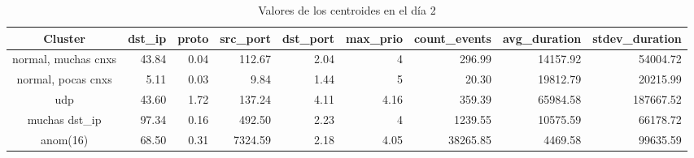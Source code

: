 \begin{table}[h]
    \begingroup
    \setlength{\tabcolsep}{2pt} %
    \renewcommand{\arraystretch}{2} %
    \hspace*{-3cm}
    \begin{tabular}{|c|r|r|r|r|r|r|r|r|}
    \hline
    \textbf{Cluster}    & \textbf{dst\_ip} & \textbf{proto} & \textbf{src\_port} & \textbf{dst\_port} & \textbf{max\_prio} & \textbf{count\_events} & \textbf{avg\_duration} & \textbf{stdev\_duration} \\ \hline
    normal, muchas cnxs & 43.84            & 0.04           & 112.67             & 2.04               & 4                  & 296.99                 & 14157.92               & 54004.72                 \\ \hline
    normal, pocas cnxs  & 5.11             & 0.03           & 9.84               & 1.44               & 5                  & 20.30                  & 19812.79               & 20215.99                 \\ \hline
    udp                 & 43.60            & 1.72           & 137.24             & 4.11               & 4.16               & 359.39                 & 65984.58               & 187667.52                \\ \hline
    muchas dst\_ip      & 97.34            & 0.16           & 492.50             & 2.23               & 4                  & 1239.55                & 10575.59               & 66178.72                 \\ \hline
    anom(16)            & 68.50            & 0.31           & 7324.59            & 2.18               & 4.05               & 38265.85               & 4469.58                & 99635.59                 \\ \hline
    \end{tabular}
    \endgroup
\bigskip
\caption{Valores de los centroides en el día 2}
\bigskip
\label{tab:dia2}
\end{table}

